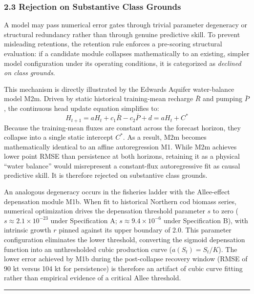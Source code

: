 \documentclass[11pt]{article}
\begin{document}
\subsubsection{2.3 Rejection on Substantive Class
Grounds}\label{rejection-on-substantive-class-grounds}

A model may pass numerical error gates through trivial parameter
degeneracy or structural redundancy rather than through genuine
predictive skill. To prevent misleading retentions, the retention rule
enforces a pre-scoring structural evaluation: if a candidate module
collapses mathematically to an existing, simpler model configuration
under its operating conditions, it is categorized as \emph{declined on
class grounds}.

This mechanism is directly illustrated by the Edwards Aquifer
water-balance model M2m. Driven by static historical training-mean
recharge \(\bar{R}\) and pumping \(\bar{P}\), the continuous head update
equation simplifies to:
\[H_{t+1} = a H_t + c_1 \bar{R} - c_2 \bar{P} + d = a H_t + C^*\]
Because the training-mean fluxes are constant across the forecast
horizon, they collapse into a single static intercept \(C^*\). As a
result, M2m becomes mathematically identical to an affine autoregression
M1. While M2m achieves lower point RMSE than persistence at both
horizons, retaining it as a physical ``water balance'' would
misrepresent a constant-flux autoregressive fit as causal predictive
skill. It is therefore rejected on substantive class grounds.

An analogous degeneracy occurs in the fisheries ladder with the
Allee-effect depensation module M1b. When fit to historical Northern cod
biomass series, numerical optimization drives the depensation threshold
parameter \(s\) to zero (\(s \approx 2.1 \times 10^{-23}\) under
Specification A; \(s \approx 9.4 \times 10^{-6}\) under Specification
B), with intrinsic growth \(r\) pinned against its upper boundary of
2.0. This parameter configuration eliminates the lower threshold,
converting the sigmoid depensation function into an unthresholded cubic
production curve (\(a(S_t) = S_t / K\)). The lower error achieved by M1b
during the post-collapse recovery window (RMSE of 90 kt versus 104 kt
for persistence) is therefore an artifact of cubic curve fitting rather
than empirical evidence of a critical Allee threshold.

\begin{center}\rule{0.5\linewidth}{0.5pt}\end{center}
\end{document}
